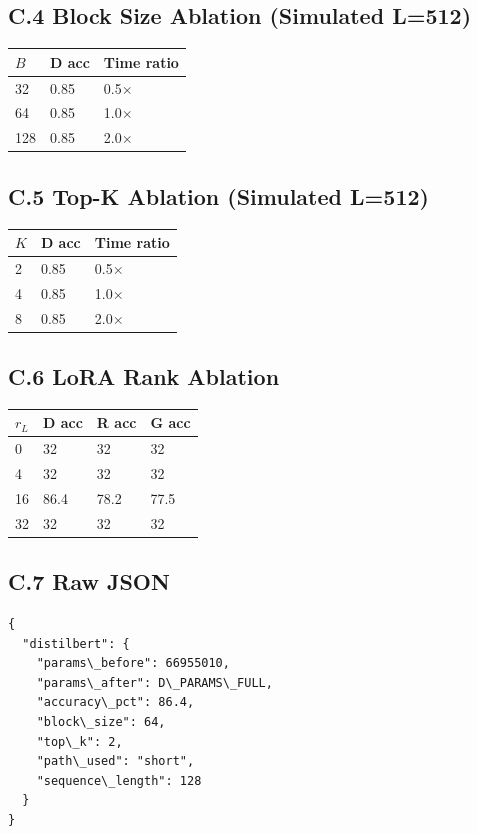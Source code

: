 \subsection{C.4 Block Size Ablation (Simulated L=512)}

\begin{table}[H]
\centering
\small
\begin{tabular}{lll}
\toprule
\textbf{$B$} & \textbf{D acc} & \textbf{Time ratio} \\
\midrule
32 & 0.85 & 0.5$\times$ \\
64 & 0.85 & 1.0$\times$ \\
128 & 0.85 & 2.0$\times$ \\
\bottomrule
\end{tabular}
\end{table}

\subsection{C.5 Top-K Ablation (Simulated L=512)}

\begin{table}[H]
\centering
\small
\begin{tabular}{lll}
\toprule
\textbf{$K$} & \textbf{D acc} & \textbf{Time ratio} \\
\midrule
2 & 0.85 & 0.5$\times$ \\
4 & 0.85 & 1.0$\times$ \\
8 & 0.85 & 2.0$\times$ \\
\bottomrule
\end{tabular}
\end{table}

\subsection{C.6 LoRA Rank Ablation}

\begin{table}[H]
\centering
\small
\begin{tabular}{llll}
\toprule
\textbf{$r_L$} & \textbf{D acc} & \textbf{R acc} & \textbf{G acc} \\
\midrule
0 & 32 & 32 & 32 \\
4 & 32 & 32 & 32 \\
16 & 86.4 & 78.2 & 77.5 \\
32 & 32 & 32 & 32 \\
\bottomrule
\end{tabular}
\end{table}

\subsection{C.7 Raw JSON}

\begin{lstlisting}
{
  "distilbert": {
    "params\_before": 66955010,
    "params\_after": D\_PARAMS\_FULL,
    "accuracy\_pct": 86.4,
    "block\_size": 64,
    "top\_k": 2,
    "path\_used": "short",
    "sequence\_length": 128
  }
}
\end{lstlisting}

